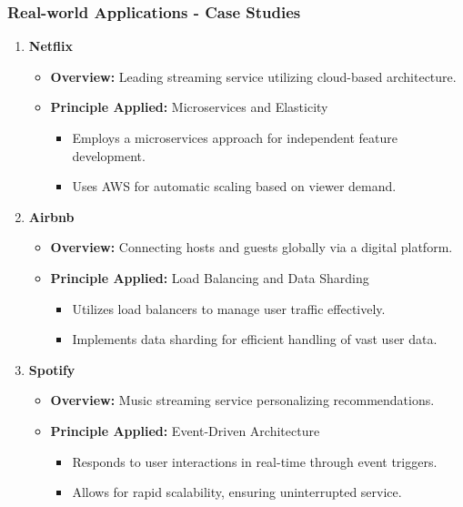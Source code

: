 \documentclass{beamer}
\begin{document}
\begin{frame}[fragile]
    \frametitle{Real-world Applications - Case Studies}
    \begin{enumerate}
        \item \textbf{Netflix}
            \begin{itemize}
                \item \textbf{Overview:} Leading streaming service utilizing cloud-based architecture.
                \item \textbf{Principle Applied:} Microservices and Elasticity
                    \begin{itemize}
                        \item Employs a microservices approach for independent feature development.
                        \item Uses AWS for automatic scaling based on viewer demand.
                    \end{itemize}
            \end{itemize}
        
        \item \textbf{Airbnb}
            \begin{itemize}
                \item \textbf{Overview:} Connecting hosts and guests globally via a digital platform.
                \item \textbf{Principle Applied:} Load Balancing and Data Sharding
                    \begin{itemize}
                        \item Utilizes load balancers to manage user traffic effectively.
                        \item Implements data sharding for efficient handling of vast user data.
                    \end{itemize}
            \end{itemize}

        \item \textbf{Spotify}
            \begin{itemize}
                \item \textbf{Overview:} Music streaming service personalizing recommendations.
                \item \textbf{Principle Applied:} Event-Driven Architecture
                    \begin{itemize}
                        \item Responds to user interactions in real-time through event triggers.
                        \item Allows for rapid scalability, ensuring uninterrupted service.
                    \end{itemize}
            \end{itemize}
    \end{enumerate}
\end{frame}
\end{document}
